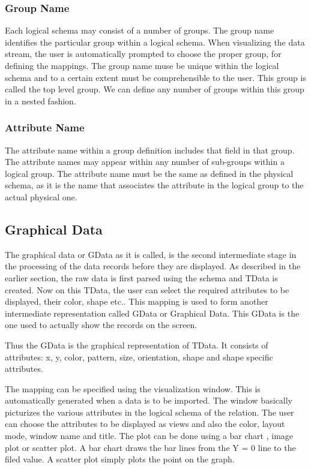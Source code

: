 \subsubsection{Group Name}

Each logical schema may consist of a number of groups. The group name identifies the particular group within a logical schema. When visualizing the data stream, the user is automatically prompted to choose the proper group, for defining the mappings. The group name muse be unique within the logical schema and to a certain extent must be comprehensible to the user. This group is called the top level group. We can define any number of groups within this group in a nested fashion.

\subsubsection{Attribute Name}

The attribute name within a group definition includes that field in that group. The attribute names may appear within any number of sub-groups within a logical group. The attribute name must be the same as defined in the physical schema, as it is the name that associates the attribute in the logical group to the actual physical one.

\subsection{Graphical Data}

The graphical data or GData as it is called, is the second intermediate stage in the processing of the data records before they are displayed. As described in the earlier section, the raw data is first parsed using the schema and TData is created. Now on this TData, the user can select the required attributes to be displayed, their color, shape etc.. This mapping is used to form another intermediate representation called GData or Graphical Data. This GData is the one used to actually show the records on the screen.

Thus the GData is the graphical representation of TData. It consists of attributes: x, y, color, pattern, size, orientation, shape and shape specific attributes.

The mapping can be specified using the visualization window. This is automatically generated when a data is to be imported. The window basically picturizes the various attributes in the logical schema of the relation. The user can choose the attributes to be displayed as views and also the color, layout mode, window name and title. The plot can be done using a bar chart , image plot or scatter plot. A bar chart draws the bar lines from the Y = 0 line to the filed value. A scatter plot simply plots the point on the graph.

